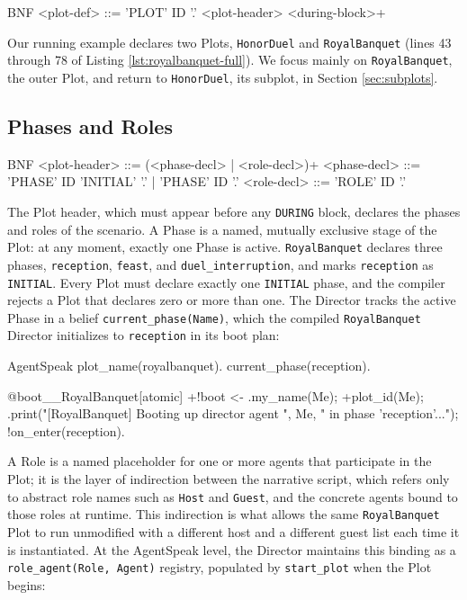 \begin{codeblock}[]{BNF}
    <plot-def>   ::= 'PLOT' ID '.' <plot-header> <during-block>+
\end{codeblock}

Our running example declares two Plots, \lstinline|HonorDuel| and \lstinline|RoyalBanquet| (lines 43 through 78 of Listing \ref{lst:royalbanquet-full}). We focus mainly on \lstinline|RoyalBanquet|, the outer Plot, and return to \lstinline|HonorDuel|, its subplot, in Section \ref{sec:subplots}.

\subsection{Phases and Roles}
\begin{codeblock}[]{BNF}
    <plot-header>  ::= (<phase-decl> | <role-decl>)+
    <phase-decl>   ::= 'PHASE' ID 'INITIAL' '.' | 'PHASE' ID '.'
    <role-decl>    ::= 'ROLE' ID '.'
\end{codeblock}

The Plot header, which must appear before any \lstinline|DURING| block, declares the phases and roles of the scenario. A Phase is a named, mutually exclusive stage of the Plot: at any moment, exactly one Phase is active. \lstinline|RoyalBanquet| declares three phases, \lstinline|reception|, \lstinline|feast|, and \lstinline|duel_interruption|, and marks \lstinline|reception| as \lstinline|INITIAL|. Every Plot must declare exactly one \lstinline|INITIAL| phase, and the compiler rejects a Plot that declares zero or more than one. The Director tracks the active Phase in a belief \lstinline|current_phase(Name)|, which the compiled \lstinline|RoyalBanquet| Director initializes to \lstinline|reception| in its boot plan:

\begin{codeblock}[]{AgentSpeak}
plot_name(royalbanquet).
current_phase(reception).

@boot__RoyalBanquet[atomic]
+!boot <-
    .my_name(Me);
    +plot_id(Me);
    .print("[RoyalBanquet] Booting up director agent ", Me,
        " in phase 'reception'...");
    !on_enter(reception).
\end{codeblock}

A Role is a named placeholder for one or more agents that participate in the Plot; it is the layer of indirection between the narrative script, which refers only to abstract role names such as \lstinline|Host| and \lstinline|Guest|, and the concrete agents bound to those roles at runtime. This indirection is what allows the same \lstinline|RoyalBanquet| Plot to run unmodified with a different host and a different guest list each time it is instantiated. At the AgentSpeak level, the Director maintains this binding as a \lstinline|role_agent(Role, Agent)| registry, populated by \lstinline|start_plot| when the Plot begins:

